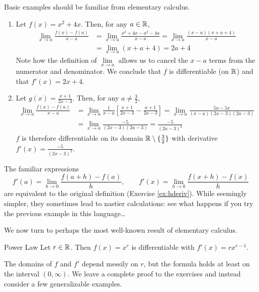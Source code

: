 \begin{examples}{}{}
	Basic examples should be familiar from elementary calculus.
	\begin{enumerate}
	  \item Let $f(x)=x^2+4x$. Then, for any $a\in\mathbb{R}$,
		\begin{align*}
			\lim_{x\to a}\frac{f(x)-f(a)}{x-a}
			&=\lim_{x\to a}\frac{x^2+4x-a^2-4a}{x-a} 
			=\lim_{x\to a}\frac{(x-a)(x+a+4)}{x-a}\\
			&=\lim_{x\to a}(x+a+4)=2a+4
		\end{align*}
		Note how the definition of $\lim\limits_{x\to a}$ allows us to cancel the $x-a$ terms from the numerator and denominator. We conclude that $f$ is differentiable (on $\mathbb{R}$) and that $f'(x)=2x+4$.
		
		\item Let $g(x)=\frac{x+1}{2x-3}$. Then, for any $a\neq\frac 32$,
		\begin{align*}
			\lim_{x\to a}\frac{f(x)-f(a)}{x-a}
			&=\lim_{x\to a}\frac 1{x-a}\left[\frac{x+1}{2x-3}-\frac{a+1}{2a-3}\right] 
			=\lim_{x\to a}\frac{5a-5x}{(x-a)(2x-3)(2a-3)}\\
			&=\lim_{x\to a}\frac{-5}{(2x-3)(2a-3)} 
			=\frac{-5}{(2a-3)^2}
		\end{align*}
		$f$ is therefore differentiable on its domain $\mathbb{R}\setminus\{\frac 32\}$ with derivative $f'(x)=\frac{-5}{(2x-3)^2}$.
	\end{enumerate}
\end{examples}

The familiar expressions
\[
	f'(a)=\lim_{h\to 0}\frac{f(a+h)-f(a)}h,\qquad 
	f'(x)=\lim_{h\to 0}\frac{f(x+h)-f(x)}h
\]
are equivalent to the original definition (Exercise \ref{ex:hderiv}). While seemingly simpler, they sometimes lead to nastier calculations: see what happens if you try the previous example in this language\ldots\medbreak\goodbreak

We now turn to perhaps the most well-known result of elementary calculus.

\begin{thm}{Power Law}{}
	Let $r\in\mathbb{R}$. Then $f(x)=x^r$ is differentiable with $f'(x)=rx^{r-1}$.
\end{thm}

The domains of $f$ and $f'$ depend messily on $r$, but the formula holds at least on the interval $(0,\infty)$. We leave a complete proof to the exercises and instead consider a few generalizable examples.

